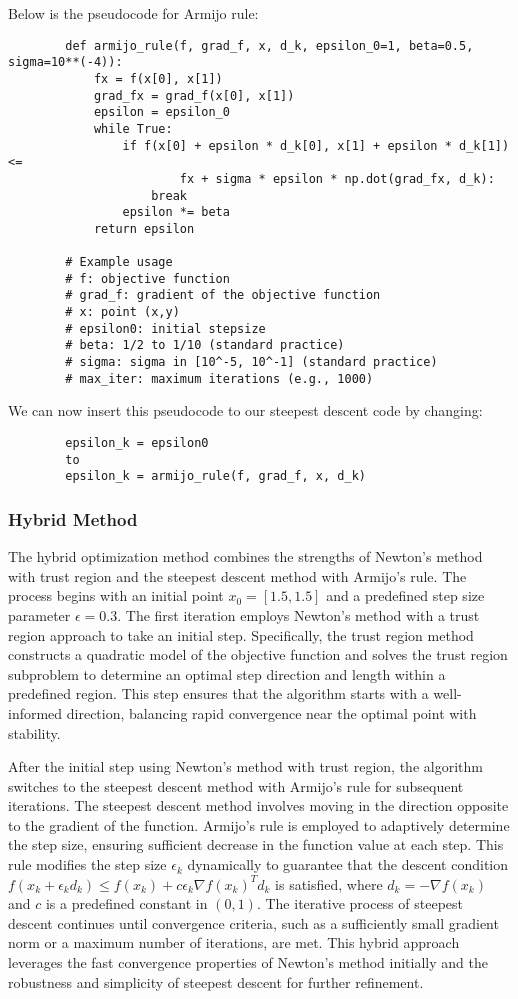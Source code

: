 \documentclass{article} %
\theoremstyle{definition}
\theoremstyle{remark}
\theoremstyle{plain}
\begin{document}
    Below is the pseudocode for Armijo rule:
    \begin{verbatim}
        def armijo_rule(f, grad_f, x, d_k, epsilon_0=1, beta=0.5, sigma=10**(-4)):
            fx = f(x[0], x[1])
            grad_fx = grad_f(x[0], x[1])
            epsilon = epsilon_0
            while True:
                if f(x[0] + epsilon * d_k[0], x[1] + epsilon * d_k[1]) <= 
                        fx + sigma * epsilon * np.dot(grad_fx, d_k):
                    break
                epsilon *= beta
            return epsilon

        # Example usage
        # f: objective function
        # grad_f: gradient of the objective function
        # x: point (x,y)
        # epsilon0: initial stepsize
        # beta: 1/2 to 1/10 (standard practice)
        # sigma: sigma in [10^-5, 10^-1] (standard practice)
        # max_iter: maximum iterations (e.g., 1000)
    \end{verbatim}

    
    We can now insert this pseudocode to our steepest descent code by changing:
    \begin{verbatim}
        epsilon_k = epsilon0 
        to 
        epsilon_k = armijo_rule(f, grad_f, x, d_k)
    \end{verbatim}

    \subsubsection{Hybrid Method}
    The hybrid optimization method combines the strengths of Newton's method with trust region and the steepest descent method with Armijo's rule. The process begins with an initial point \( x_0 = [1.5, 1.5] \) and a predefined step size parameter \( \epsilon = 0.3 \). The first iteration employs Newton's method with a trust region approach to take an initial step. Specifically, the trust region method constructs a quadratic model of the objective function and solves the trust region subproblem to determine an optimal step direction and length within a predefined region. This step ensures that the algorithm starts with a well-informed direction, balancing rapid convergence near the optimal point with stability.

    After the initial step using Newton's method with trust region, the algorithm switches to the steepest descent method with Armijo’s rule for subsequent iterations. The steepest descent method involves moving in the direction opposite to the gradient of the function. Armijo's rule is employed to adaptively determine the step size, ensuring sufficient decrease in the function value at each step. This rule modifies the step size \( \epsilon_k \) dynamically to guarantee that the descent condition \( f(x_k + \epsilon_k d_k) \leq f(x_k) + c \epsilon_k \nabla f(x_k)^T d_k \) is satisfied, where \( d_k = -\nabla f(x_k) \) and \( c \) is a predefined constant in \( (0, 1) \). The iterative process of steepest descent continues until convergence criteria, such as a sufficiently small gradient norm or a maximum number of iterations, are met. This hybrid approach leverages the fast convergence properties of Newton’s method initially and the robustness and simplicity of steepest descent for further refinement.
    
\end{document}
